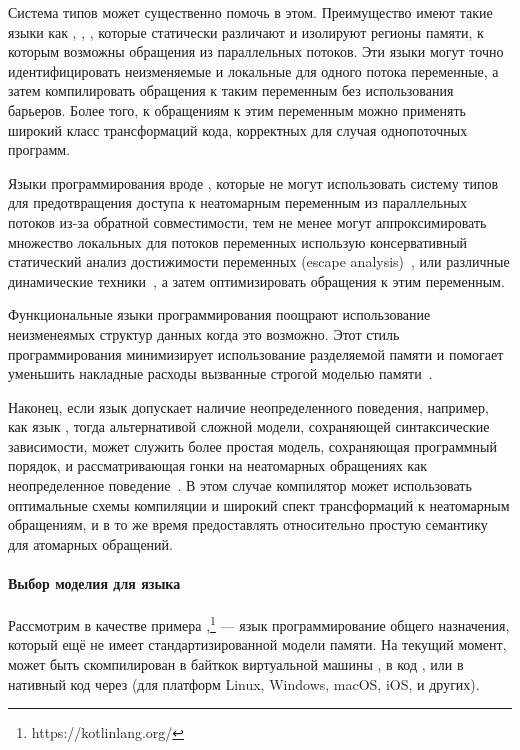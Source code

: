 Система типов может существенно помочь в этом. 
Преимущество имеют такие языки как \Haskell, \OCaml, \Rust, 
которые статически различают и изолируют регионы памяти, 
к которым возможны обращения из параллельных потоков. 
Эти языки могут точно идентифицировать неизменяемые 
и локальные для одного потока переменные, 
а затем компилировать обращения к таким переменным 
без использования барьеров. 
Более того, к обращениям к этим переменным 
можно применять широкий класс трансформаций кода, 
корректных для случая однопоточных программ. 
 
Языки программирования вроде \Java, которые не могут
использовать систему типов для предотвращения 
доступа к неатомарным переменным из параллельных потоков
из-за обратной совместимости, тем не менее 
могут аппроксимировать множество локальных 
для потоков переменных использую консервативный 
статический анализ достижимости переменных 
(escape analysis)~\cite{Choi-al:OOPSLA1999}, 
или различные динамические техники~\cite{Liu-al:PLDI19},
а затем оптимизировать обращения к этим переменным.  

Функциональные языки программирования поощрают 
использование неизменеямых структур данных когда 
это возможно. Этот стиль программирования минимизирует
использование разделяемой памяти и помогает 
уменьшить накладные расходы вызванные 
строгой моделью памяти~\cite{Vollmer-al:PPoPP17}.  

Наконец, если язык допускает наличие неопределенного поведения, 
например, как язык \CPP, тогда альтернативой сложной модели, 
сохраняющей синтаксические зависимости, 
может служить более простая модель, сохраняющая программный порядок, 
и рассматривающая гонки на неатомарных обращениях как 
неопределенное поведение~\cite{Boehm-Demsky:MSPC14, Ou-Demsky:OOPSLA18}.
В этом случае компилятор может использовать оптимальные 
схемы компиляции и широкий спект трансформаций к неатомарным обращениям,
и в то же время предоставлять относительно простую семантику 
для атомарных обращений. 

\paragraph{Выбор моделия для языка \Kotlin}

Рассмотрим в качестве примера \Kotlin,\footnote{https://kotlinlang.org/} --- 
язык программирование общего назначения, который ещё 
не имеет стандартизированной модели памяти. 
На текущий момент, \Kotlin может быть скомпилирован 
в байткок виртуальной машины \Java, в код \JS, 
или в нативный код через \LLVM
(для платформ Linux, Windows, macOS, iOS, и других).

